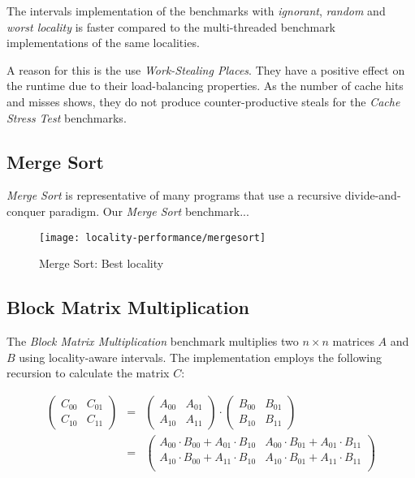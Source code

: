 The intervals implementation of the benchmarks with \emph{ignorant},
\emph{random} and \emph{worst locality} is faster compared to the
multi-threaded benchmark implementations of the same
localities. 

A reason for this is the use \emph{Work-Stealing Places}. They have a
positive effect on the runtime due to their load-balancing
properties. As the number of cache hits and misses shows, they do not
produce counter-productive steals for the \emph{Cache Stress Test}
benchmarks.

\subsection{Merge Sort}
\label{sec:locality-performance-merge-sort}

\emph{Merge Sort} is representative of many programs that use a
recursive divide-and-conquer paradigm. Our \emph{Merge Sort}
benchmark...

\begin{figure}[!ht]
  \centering
  \texttt{[image: locality-performance/mergesort]}
  \caption{Merge Sort: Best locality}
  \label{fig:locality-performance-mergesort}
\end{figure}



\subsection{Block Matrix Multiplication}
\label{sec:locality-performance-block-matrix-multiplication}

The \emph{Block Matrix Multiplication} benchmark multiplies two $n
\times n$ matrices $A$ and $B$ using locality-aware intervals. The
implementation employs the following recursion to calculate the matrix
$C$:

\begin{eqnarray*}
  \begin{pmatrix}
    C_{00} & C_{01} \\
    C_{10} & C_{11}
  \end{pmatrix}
  &
  =
  &
  \begin{pmatrix}
    A_{00} & A_{01} \\
    A_{10} & A_{11}
  \end{pmatrix}
  \cdot
  \begin{pmatrix}
    B_{00} & B_{01} \\
    B_{10} & B_{11}
  \end{pmatrix}
  \\
  &
  =
  &
  \begin{pmatrix}
    A_{00} \cdot B_{00} + A_{01} \cdot B_{10} & A_{00} \cdot B_{01} + A_{01} \cdot B_{11} \\
    A_{10} \cdot B_{00} + A_{11} \cdot B_{10} & A_{10} \cdot B_{01} + A_{11} \cdot B_{11} \\
  \end{pmatrix}
\end{eqnarray*}

